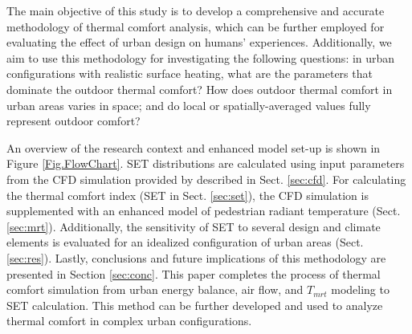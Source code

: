 \documentclass[smallextended]{svjour3}
\begin{document}
The main objective of this study is to develop a comprehensive and accurate methodology of thermal comfort analysis, which can be further employed for evaluating the effect of urban design on humans' experiences.  Additionally, we aim to use this methodology for investigating the following questions: in urban configurations with realistic surface heating, what are the parameters that dominate the outdoor thermal comfort?  How does outdoor thermal comfort in urban areas varies in space; and do local or spatially-averaged values fully represent outdoor comfort? 
 
An overview of the research context and enhanced model set-up is shown in Figure \ref{Fig.FlowChart}. SET distributions are calculated using input parameters from the CFD simulation provided by \citet{nazarian2014effects, nazarian2015cfd} described in Sect. \ref{sec:cfd}. For calculating the thermal comfort index (SET in Sect. \ref{sec:set}), the CFD simulation is supplemented with an enhanced model of pedestrian radiant temperature (Sect. \ref{sec:mrt}). Additionally, the sensitivity of SET to several design and climate elements is evaluated for an idealized configuration of urban areas (Sect. \ref{sec:res}). Lastly, conclusions and future implications of this methodology are presented in Section \ref{sec:conc}. This paper completes the process of thermal comfort simulation from urban energy balance, air flow, and $T_{mrt}$ modeling to SET calculation. This method can be further developed and used to analyze thermal comfort in complex urban configurations.


{}%
%
%
\end{document}
